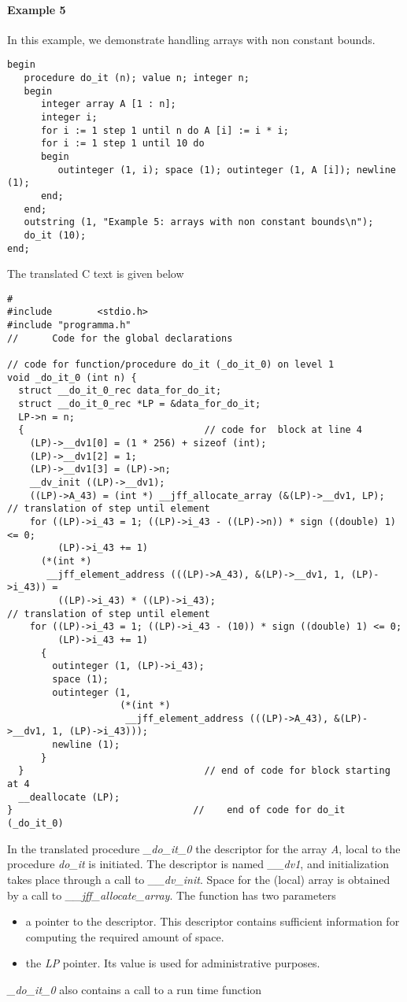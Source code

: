 \documentclass[11pt]{article}
\begin{document}
\paragraph{Example 5}
In this example, we demonstrate handling arrays with non constant bounds.
{\footnotesize
\begin{verbatim}
begin
   procedure do_it (n); value n; integer n;
   begin
      integer array A [1 : n];
      integer i;
      for i := 1 step 1 until n do A [i] := i * i;
      for i := 1 step 1 until 10 do
      begin
         outinteger (1, i); space (1); outinteger (1, A [i]); newline (1);
      end;
   end;
   outstring (1, "Example 5: arrays with non constant bounds\n");
   do_it (10);
end;
\end{verbatim}
}
The translated C text is given below
{\footnotesize
\begin{verbatim}
#
#include        <stdio.h>
#include "programma.h"
//      Code for the global declarations

// code for function/procedure do_it (_do_it_0) on level 1
void _do_it_0 (int n) {
  struct __do_it_0_rec data_for_do_it;
  struct __do_it_0_rec *LP = &data_for_do_it;
  LP->n = n;
  {                                // code for  block at line 4 
    (LP)->__dv1[0] = (1 * 256) + sizeof (int);
    (LP)->__dv1[2] = 1;
    (LP)->__dv1[3] = (LP)->n;
    __dv_init ((LP)->__dv1);
    ((LP)->A_43) = (int *) __jff_allocate_array (&(LP)->__dv1, LP);
// translation of step until element
    for ((LP)->i_43 = 1; ((LP)->i_43 - ((LP)->n)) * sign ((double) 1) <= 0;
         (LP)->i_43 += 1)
      (*(int *)
       __jff_element_address (((LP)->A_43), &(LP)->__dv1, 1, (LP)->i_43)) =
         ((LP)->i_43) * ((LP)->i_43);
// translation of step until element
    for ((LP)->i_43 = 1; ((LP)->i_43 - (10)) * sign ((double) 1) <= 0;
         (LP)->i_43 += 1)
      {
        outinteger (1, (LP)->i_43);
        space (1);
        outinteger (1,
                    (*(int *)
                     __jff_element_address (((LP)->A_43), &(LP)->__dv1, 1, (LP)->i_43)));
        newline (1);
      }
  }                                // end of code for block starting at 4
  __deallocate (LP);
}                                //    end of code for do_it (_do_it_0)
\end{verbatim}
}
In the translated procedure {\em \_do\_it\_0} the descriptor for the array {\em A},
local to the procedure {\em do\_it} is initiated.
The descriptor is named {\em \_\_dv1}, and initialization takes place through a
call to {\em \_\_dv\_init}.
Space for the (local) array is obtained by a call to
{\em \_\_jff\_allocate\_array}. The function has two
parameters
\begin{itemize}
\item a pointer to the descriptor. This descriptor contains
sufficient information for computing the required amount of space.
\item the {\em LP} pointer. Its value is used for administrative
purposes.
\end{itemize}
{\em \_do\_it\_0} also contains a call to a run time function
\end{document}
